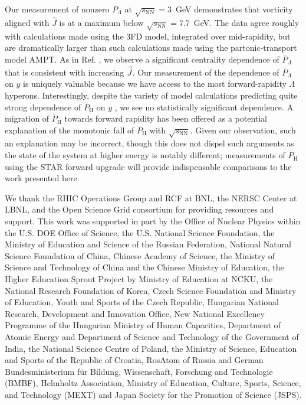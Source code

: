 \documentclass[
  reprint,
  superscriptaddress,
  amsmath,
  amssymb,
  aps,
  floatfix,
]{revtex4-2}
\newcommand{\sNN}{\sqrt{s_\mathrm{NN}}}
\newcommand{\Jsys}{\vec{J}}
\newcommand{\JsysHat}{\hat{J}}
\newcommand{\PLambda}{\overline{P}_{\Lambda}}
\newcommand{\PHyper}{\overline{P}_\mathrm{H}}
\begin{document}
Our measurement of nonzero $\PLambda$ at
 $\sNN=3$~GeV demonstrates that vorticity aligned
 with $\JsysHat$ is at a maximum
 below $\sNN=7.7$~GeV. The data agree roughly
 with calculations made using the 3FD
 model, integrated over mid-rapidity, but are
 dramatically larger than such calculations made
 using the partonic-transport model AMPT.
 As in Ref. \cite{Adam:2018ivw}, we observe
 a significant centrality dependence of $\PLambda$
 that is consistent with increasing $\Jsys$.
 Our measurement of the dependence of
 $\PLambda$ on $y$ is uniquely valuable
 because we have access to the
 most forward-rapidity $\Lambda$ hyperons. Interestingly, despite
 the variety of model calculations predicting
 quite strong dependence of $\PHyper$ on
 $y$ \cite{Jiang:2016woz,Ivanov:2018eej,Wu:2019eyi,Ivanov:2019ern,Ivanov:2020wak,Liang:2019pst,Deng:2016gyh,Wei:2018zfb,Xie:2019jun}, 
 we see no statistically
 significant dependence. A migration of $\PHyper$
 towards forward rapidity has been offered
 as a potential explanation of the
 monotonic fall of $\PHyper$ with $\sNN$\cite{Jiang:2016woz}.
 Given our observation, such an explanation
 may be incorrect, though this does
 not dispel such arguments as the
 state of the system at higher
 energy is notably different; measurements of
 $\PHyper$ using the STAR forward upgrade
 will provide indispensable comparisons to the
 work presented here.
  
We thank the RHIC Operations Group
 and RCF at BNL, the NERSC
 Center at LBNL, and the Open
 Science Grid consortium for providing resources
 and support.  This work was
 supported in part by the Office
 of Nuclear Physics within the U.S.
 DOE Office of Science, the U.S.
 National Science Foundation, the Ministry of
 Education and Science of the Russian
 Federation, National Natural Science Foundation of
 China, Chinese Academy of Science, the
 Ministry of Science and Technology of
 China and the Chinese Ministry of
 Education, the Higher Education Sprout Project
 by Ministry of Education at NCKU,
 the National Research Foundation of Korea,
 Czech Science Foundation and Ministry of
 Education, Youth and Sports of the
 Czech Republic, Hungarian National Research, Development
 and Innovation Office, New National Excellency
 Programme of the Hungarian Ministry of
 Human Capacities, Department of Atomic Energy
 and Department of Science and Technology
 of the Government of India, the
 National Science Centre of Poland, the
 Ministry  of Science, Education and
 Sports of the Republic of Croatia,
 RosAtom of Russia and German Bundesministerium
 f\"ur Bildung, Wissenschaft, Forschung and Technologie
 (BMBF), Helmholtz Association, Ministry of Education,
 Culture, Sports, Science, and Technology (MEXT)
 and Japan Society for the Promotion
 of Science (JSPS).


\end{document}
